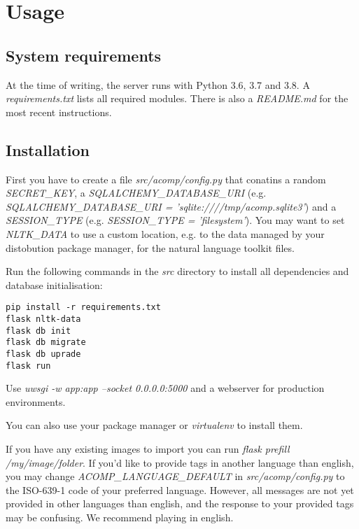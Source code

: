 \section{Usage}
\label{gXLII:sec:usage}  %

\subsection{System requirements}
\label{gXLII:sec:usage:requirements}  %
At the time of writing, the server runs with Python 3.6, 3.7 and 3.8. A
\textit{requirements.txt} lists all required modules.
There is also a \textit{README.md} for the most recent instructions.

\subsection{Installation}
\label{gXLII:sec:usage:instllation}  %
First you have to create a file \textit{src/acomp/config.py} that conatins
a random \textit{SECRET\_KEY}, a \textit{SQLALCHEMY\_DATABASE\_URI}
(e.g. \textit{SQLALCHEMY\_DATABASE\_URI = 'sqlite:////tmp/acomp.sqlite3'}) and
a \textit{SESSION\_TYPE} (e.g. \textit{SESSION\_TYPE = 'filesystem'}).
You may want to set \textit{NLTK\_DATA} to use a custom location, e.g. to the data
managed by your distobution package manager, for the natural language toolkit files.

Run the following commands in the \textit{src} directory to install all dependencies and
database initialisation:

\begin{lstlisting}
pip install -r requirements.txt
flask nltk-data
flask db init
flask db migrate
flask db uprade
flask run
\end{lstlisting}

Use \textit{uwsgi -w app:app --socket 0.0.0.0:5000} and a webserver for production environments.

You can also use your package manager or \textit{virtualenv} to install them.

If you have any existing images to import you can run
\textit{flask prefill /my/image/folder}.
If you'd like to provide tags in another language than english, you may change
\textit{ACOMP\_LANGUAGE\_DEFAULT} in \textit{src/acomp/config.py} to the
ISO-639-1  code of your preferred language.
However, all messages are not yet provided in other languages than english,
and the response to your provided tags may be confusing.
We recommend playing in english.

